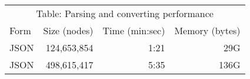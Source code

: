{\begin{minipage}[t]{242mm}
\linespread{2.1}\fontsize{28}{20}\sffamily\selectfont
\color[cmyk]{0,0,0,1}
\begin{center}
\begin{tabular}{lrrr}
\multicolumn{4}{c}{Table: Parsing and converting performance} \\
Form & Size (nodes) & Time (min:sec) & Memory (bytes) \\
\hline
\hline
JSON & 124,653,854 & 1:21 & 29G \\
JSON & 498,615,417 & 5:35 & 136G \\
\end{tabular}
\end{center}
\vspace{1mm}
\end{minipage} }
